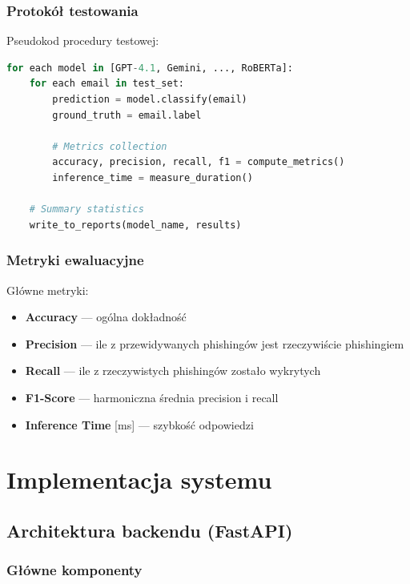 \documentclass[11pt]{extreport}
\begin{document}
\subsection{Protokół testowania}

Pseudokod procedury testowej:

\begin{lstlisting}[language=Python, caption={Protokół testowania modeli}, label={lst:protocol}]
for each model in [GPT-4.1, Gemini, ..., RoBERTa]:
    for each email in test_set:
        prediction = model.classify(email)
        ground_truth = email.label
        
        # Metrics collection
        accuracy, precision, recall, f1 = compute_metrics()
        inference_time = measure_duration()
        
    # Summary statistics
    write_to_reports(model_name, results)
\end{lstlisting}

\subsection{Metryki ewaluacyjne}

Główne metryki:
\begin{itemize}
    \item \textbf{Accuracy} --- ogólna dokładność
    \item \textbf{Precision} --- ile z przewidywanych phishingów jest rzeczywiście phishingiem
    \item \textbf{Recall} --- ile z rzeczywistych phishingów zostało wykrytych
    \item \textbf{F1-Score} --- harmoniczna średnia precision i recall
    \item \textbf{Inference Time} [ms] --- szybkość odpowiedzi
\end{itemize}

\chapter{Implementacja systemu}
\label{ch:implementacja}

\section{Architektura backendu (FastAPI)}
\label{sec:backend}

\subsection{Główne komponenty}
\end{document}
